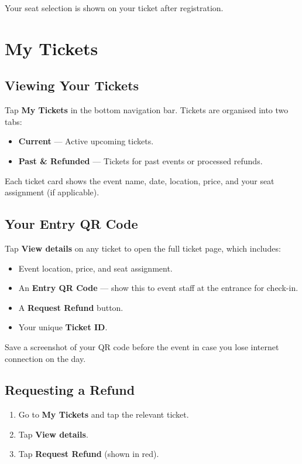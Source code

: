 \documentclass[12pt, twoside]{report}
\newcommand{\uielem}[1]{\textbf{#1}}
\begin{document}
Your seat selection is shown on your ticket after registration.


\chapter{My Tickets}


\section{Viewing Your Tickets}

Tap \uielem{My Tickets} in the bottom navigation bar. Tickets are organised
into two tabs:

\begin{itemize}
  \item \uielem{Current} --- Active upcoming tickets.
  \item \uielem{Past \& Refunded} --- Tickets for past events or processed refunds.
\end{itemize}

Each ticket card shows the event name, date, location, price, and your
seat assignment (if applicable).

\section{Your Entry QR Code}

Tap \uielem{View details} on any ticket to open the full ticket page, which includes:

\begin{itemize}
  \item Event location, price, and seat assignment.
  \item An \textbf{Entry QR Code} --- show this to event staff at the entrance
        for check-in.
  \item A \textbf{Request Refund} button.
  \item Your unique \textbf{Ticket ID}.
\end{itemize}

\begin{tipbox}
Save a screenshot of your QR code before the event in case you lose
internet connection on the day.
\end{tipbox}

\section{Requesting a Refund}

\begin{enumerate}
  \item Go to \uielem{My Tickets} and tap the relevant ticket.
  \item Tap \uielem{View details}.
  \item Tap \uielem{Request Refund} (shown in red).
\end{enumerate}
\end{document}
